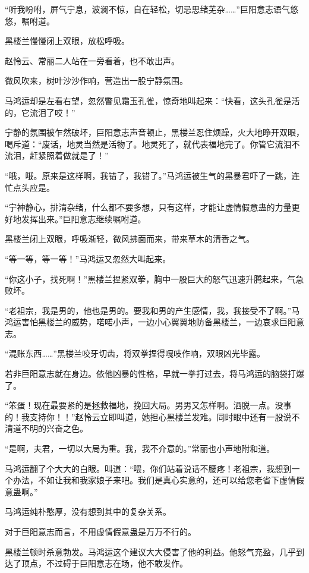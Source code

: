 
\begin{this_body}

“听我吩咐，屏气宁息，波澜不惊，自在轻松，切忌思绪芜杂……”巨阳意志语气悠悠，嘱咐道。

黑楼兰慢慢闭上双眼，放松呼吸。

赵怜云、常丽二人站在一旁看着，也不敢出声。

微风吹来，树叶沙沙作响，营造出一股宁静氛围。

马鸿运却是左看右望，忽然瞥见霜玉孔雀，惊奇地叫起来：“快看，这头孔雀是活的，它流泪了哎！”

宁静的氛围被乍然破坏，巨阳意志声音顿止，黑楼兰忍住烦躁，火大地睁开双眼，喝斥道：“废话，地灵当然是活物了。地灵死了，就代表福地完了。你管它流泪不流泪，赶紧照着做就是了！”

“哦，哦。原来是这样啊，我错了，我错了。”马鸿运被生气的黑暴君吓了一跳，连忙点头应是。

“宁神静心，排清杂绪，什么都不要多想，只有这样，才能让虚情假意蛊的力量更好地发挥出来。”巨阳意志继续嘱咐道。

黑楼兰闭上双眼，呼吸渐轻，微风拂面而来，带来草木的清香之气。

“等一等，等一等！”马鸿运又忽然大叫起来。

“你这小子，找死啊！”黑楼兰捏紧双拳，胸中一股巨大的怒气迅速升腾起来，气急败坏。

“老祖宗，我是男的，他也是男的。要我和男的产生感情，我，我接受不了啊。”马鸿运害怕黑楼兰的威势，喏喏小声，一边小心翼翼地防备黑楼兰，一边哀求巨阳意志。

“混账东西……”黑楼兰咬牙切齿，将双拳捏得嘎吱作响，双眼凶光毕露。

若非巨阳意志就在身边。依他凶暴的性格，早就一拳打过去，将马鸿运的脑袋打爆了。

“笨蛋！现在最要紧的是拯救福地，挽回大局。男男又怎样啊。洒脱一点。没事的！我支持你！！”赵怜云立即叫道，她担心黑楼兰发难。同时眼中还有一股说不清道不明的兴奋之色。

“是啊，夫君，一切以大局为重。我，我不介意的。”常丽也小声地附和道。

马鸿运翻了个大大的白眼。叫道：“喂，你们站着说话不腰疼！老祖宗，我想到一个办法，不如让我和我家娘子来吧。我们是真心实意的，还可以给您老省下虚情假意蛊啊。”

马鸿运纯朴憨厚，没有想到其中的复杂关系。

对于巨阳意志而言，不用虚情假意蛊是万万不行的。

黑楼兰顿时杀意勃发。马鸿运这个建议大大侵害了他的利益。他怒气充盈，几乎到达了顶点，不过碍于巨阳意志在场，他不敢发作。


\end{this_body}
